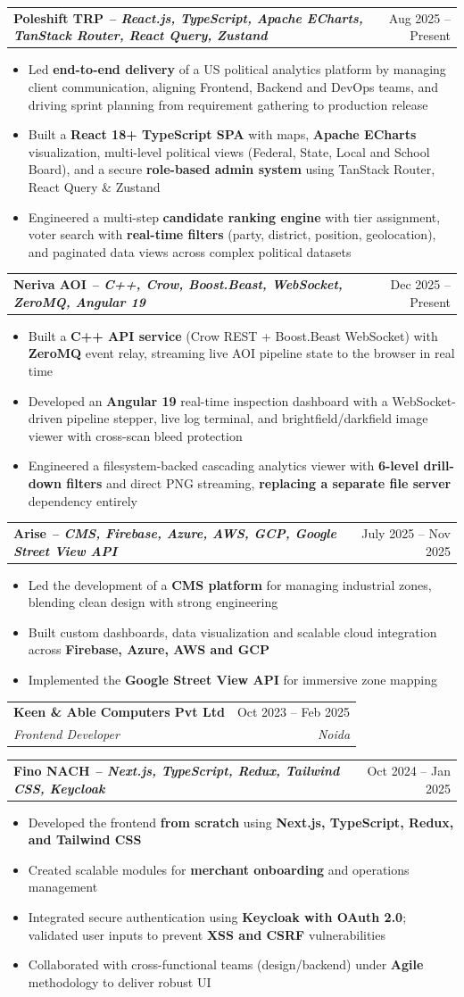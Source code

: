 \documentclass[a4paper,11pt]{article}
\makeatletter
\newcommand{\resumeItem}[1]{
  \item\small{#1}
}
\newcommand{\resumeItemListStart}{\begin{itemize}[rightmargin=0.11in]}
\newcommand{\resumeItemListEnd}{\end{itemize}}
\newcommand{\resumeQuadHeading}[4]{
  \item
  \begin{tabular*}{0.96\textwidth}[t]{l@{\extracolsep{\fill}}r}
    \textbf{#1} & #2 \\
    \textit{\small#3} & \textit{\small #4} \\
  \end{tabular*}
}
\newcommand{\resumeQuadHeadingChild}[2]{
  \item
  \begin{tabular*}{0.96\textwidth}[t]{l@{\extracolsep{\fill}}r}
    \textbf{\small#1} & {\small#2} \\
  \end{tabular*}
}
\makeatother
\begin{document}
  \resumeQuadHeadingChild{Poleshift TRP \textmd{\textit{-- React.js, TypeScript, Apache ECharts, TanStack Router, React Query, Zustand}}}{Aug 2025 -- Present}
    \resumeItemListStart{}
      \resumeItem{Led \textbf{end-to-end delivery} of a US political analytics platform by managing client communication, aligning Frontend, Backend and DevOps teams, and driving sprint planning from requirement gathering to production release}
      \resumeItem{Built a \textbf{React 18+ TypeScript SPA} with maps, \textbf{Apache ECharts} visualization, multi-level political views (Federal, State, Local and School Board), and a secure \textbf{role-based admin system} using TanStack Router, React Query \& Zustand}
      \resumeItem{Engineered a multi-step \textbf{candidate ranking engine} with tier assignment, voter search with \textbf{real-time filters} (party, district, position, geolocation), and paginated data views across complex political datasets}
    \resumeItemListEnd{}

  \resumeQuadHeadingChild{Neriva AOI \textmd{\textit{-- C++, Crow, Boost.Beast, WebSocket, ZeroMQ, Angular 19}}}{Dec 2025 -- Present}
    \resumeItemListStart{}
      \resumeItem{Built a \textbf{C++ API service} (Crow REST + Boost.Beast WebSocket) with \textbf{ZeroMQ} event relay, streaming live AOI pipeline state to the browser in real time}
      \resumeItem{Developed an \textbf{Angular 19} real-time inspection dashboard with a WebSocket-driven pipeline stepper, live log terminal, and brightfield/darkfield image viewer with cross-scan bleed protection}
      \resumeItem{Engineered a filesystem-backed cascading analytics viewer with \textbf{6-level drill-down filters} and direct PNG streaming, \textbf{replacing a separate file server} dependency entirely}
    \resumeItemListEnd{}

  \resumeQuadHeadingChild{Arise \textmd{\textit{-- CMS, Firebase, Azure, AWS, GCP, Google Street View API}}}{July 2025 -- Nov 2025}
    \resumeItemListStart{}
      \resumeItem{Led the development of a \textbf{CMS platform} for managing industrial zones, blending clean design with strong engineering}
      \resumeItem{Built custom dashboards, data visualization and scalable cloud integration across \textbf{Firebase, Azure, AWS and GCP}}
      \resumeItem{Implemented the \textbf{Google Street View API} for immersive zone mapping}
    \resumeItemListEnd{}

  \resumeQuadHeading{Keen \& Able Computers Pvt Ltd}{Oct 2023 -- Feb 2025}
  {Frontend Developer}{Noida}

  \resumeQuadHeadingChild{Fino NACH \textmd{\textit{-- Next.js, TypeScript, Redux, Tailwind CSS, Keycloak}}}{Oct 2024 -- Jan 2025}
    \resumeItemListStart{}
      \resumeItem{Developed the frontend \textbf{from scratch} using \textbf{Next.js, TypeScript, Redux, and Tailwind CSS}}
      \resumeItem{Created scalable modules for \textbf{merchant onboarding} and operations management}
      \resumeItem{Integrated secure authentication using \textbf{Keycloak with OAuth 2.0}; validated user inputs to prevent \textbf{XSS and CSRF} vulnerabilities}
      \resumeItem{Collaborated with cross-functional teams (design/backend) under \textbf{Agile} methodology to deliver robust UI}
    \resumeItemListEnd{}
\end{document}
